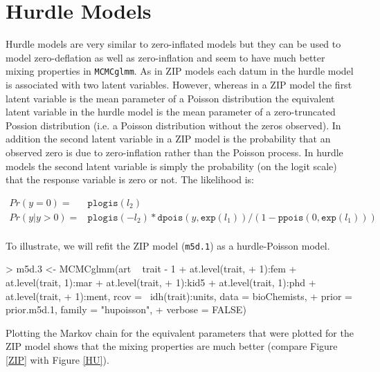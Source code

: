 \documentclass{article}
\begin{document}
\section{Hurdle Models}
\label{Hurdle}

Hurdle models are very similar to zero-inflated models but they can be used to model zero-deflation as well as zero-inflation and seem to have much better mixing properties in \texttt{MCMCglmm}.  As in ZIP models each datum in the hurdle model is associated with two latent variables. However, whereas in a ZIP model the first latent variable is the mean parameter of a Poisson distribution the equivalent latent variable in the hurdle model is the mean parameter of a zero-truncated Possion distribution (i.e. a Poisson distribution without the zeros  observed). In addition the second latent variable in a ZIP model is the probability that an observed zero is due to zero-inflation rather than the Poisson process. In hurdle models the second latent variable is simply the probability (on the logit scale) that the response variable is zero or not. The likelihood is:

\begin{equation} 
\begin{array}{rl}
Pr(y=0) =& \texttt{plogis}(l_{2})\\
Pr(y | y>0) =& \texttt{plogis}(-l_{2})\ast \texttt{dpois}(y, \texttt{exp}(l_{1}))/(1-\texttt{ppois}(0, \texttt{exp}(l_{1})))\\
\end{array}
\end{equation}

 To illustrate, we will refit the ZIP model (\texttt{m5d.1}) as a hurdle-Poisson model.

\begin{Schunk}
\begin{Sinput}
> m5d.3 <- MCMCglmm(art ~ trait - 1 + at.level(trait, 
+     1):fem + at.level(trait, 1):mar + at.level(trait, 
+     1):kid5 + at.level(trait, 1):phd + at.level(trait, 
+     1):ment, rcov = ~idh(trait):units, data = bioChemists, 
+     prior = prior.m5d.1, family = "hupoisson", 
+     verbose = FALSE)
\end{Sinput}
\end{Schunk}

Plotting the Markov chain for the equivalent parameters that were plotted for the ZIP model shows that the mixing properties are much better (compare Figure \ref{ZIP} with Figure \ref{HU}).\\
\end{document}
